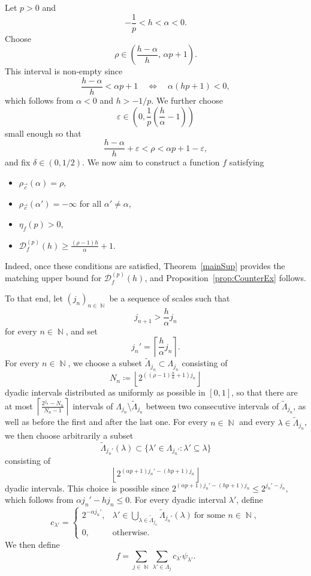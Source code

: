 \documentclass[a4paper,11pt,oneside]{article}
\DeclareMathOperator{\N}{\mathbb{N}}
\theoremstyle{definition}
\theoremstyle{plain}
\begin{document}
Let $p>0$ and
\[
-\frac1p<h<\alpha<0.
\]
Choose
\[
\rho\in\left(\frac{h-\alpha}{h},\,\alpha p+1\right).
\]
This interval is non-empty since
\[
\frac{h-\alpha}{h}<\alpha p+1
\quad\Longleftrightarrow\quad
\alpha(hp+1)<0,
\]
which follows from $\alpha<0$ and $h>-1/p$.  We further choose
\[
\varepsilon\in
\left(
0,\frac1p\left(\frac{h}{\alpha}-1\right)
\right)
\]
small enough so that
\[
\frac{h-\alpha}{h}+\varepsilon
<
\rho
<
\alpha p+1-\varepsilon,
\]
and fix $\delta\in(0,1/2)$. We now aim to construct a function $f$ satisfying
\begin{itemize}
    \item[(1)] $\rho_{\vec{c}}(\alpha)=\rho$,
    \item[(2)] $\rho_{\vec{c}}(\alpha')=-\infty$ for all $\alpha'\neq\alpha$,
    \item[(3)] $\eta_f(p)>0$,
    \item[(4)] $\mathscr{D}^{(p)}_f(h)\geq \frac{(\rho-1)h}{\alpha}+1$.
\end{itemize}
Indeed, once these conditions are satisfied, Theorem~\ref{mainSup} provides the matching upper bound for $\mathscr{D}^{(p)}_f(h)$, and Proposition~\ref{prop:CounterEx} follows.

To that end, let $(j_n)_{n\in\N}$ be a sequence of scales such that
\[
j_{n+1}>\frac{h}{\alpha}j_n
\]
for every $n\in\N$, and set
\[
j_n'=\left\lceil\frac{h}{\alpha}j_n\right\rceil.
\]
For every $n\in\N$, we choose a subset
$\widetilde{\Lambda}_{j_n}\subset\Lambda_{j_n}$ consisting of
\[
N_n\coloneqq\left\lfloor 2^{\left((\rho-1)\frac{h}{\alpha}+1\right)j_n} \right\rfloor
\]
dyadic intervals distributed as uniformly as possible in $[0,1]$, so that
there are at most
$
\left\lceil\frac{2^{j_n}-N_n}{N_n-1}\right\rceil
$
intervals of $\Lambda_{j_n}\setminus\widetilde{\Lambda}_{j_n}$ between
two consecutive intervals of $\widetilde{\Lambda}_{j_n}$, as well as
before the first and after the last one. For every $n\in\N$ and every
$\lambda\in\widetilde{\Lambda}_{j_n}$, we then choose arbitrarily a subset
\[
\widetilde{\Lambda}_{j_n'}(\lambda)
\subset
\{\lambda'\in\Lambda_{j_n'}:\lambda'\subseteq\lambda\}
\]
consisting of
\[
\left\lfloor
2^{(\alpha p+1)j_n'-(hp+1)j_n}
\right\rfloor
\]
dyadic intervals. This choice is possible since
$
2^{(\alpha p+1)j_n'-(hp+1)j_n}
\leq 2^{j_n'-j_n},
$
which follows from $\alpha j_n'-hj_n\leq0$.
For every dyadic interval $\lambda'$, define
\[
c_{\lambda'}=
\begin{cases}
2^{-\alpha j_n'},
&
\lambda'\in
\displaystyle\bigcup_{\lambda\in\widetilde{\Lambda}_{j_n}}
\widetilde{\Lambda}_{j_n'}(\lambda)
\ \text{for some }n\in\N,\\[1ex]
0,
&\text{otherwise}.
\end{cases}
\]
We then define
\[
f=\sum_{j\in\N}\sum_{\lambda'\in\Lambda_j}c_{\lambda'}\psi_{\lambda'}.
\]
\end{document}
